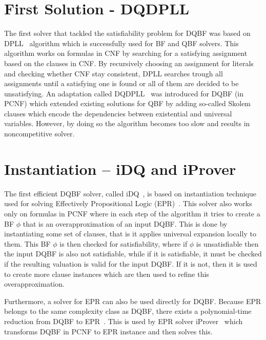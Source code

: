 \documentclass[
  digital, %
  twoside, %
  table,   %
  nolof,     %
  nolot,     %
]{fithesis3}
\theoremstyle{definition}
\theoremstyle{remark}
\begin{document}
\section{First Solution - DQDPLL}
The first solver that tackled the satisfiability problem for DQBF was based on DPLL~\cite{DPLL} algorithm which is successfully used for BF and QBF solvers. This algorithm works on formulas in CNF by searching for a satisfying assignment based on the clauses in CNF. By recursively choosing an assignment for literals and checking whether CNF stay consistent, DPLL searches trough all assignments until a satisfying one is found or all of them are decided to be unsatisfying. An adaptation called DQDPLL~\cite{DPLLalgorithm} was introduced for DQBF (in PCNF) which extended existing solutions for QBF by adding so-called Skolem clauses which encode the dependencies between existential and universal variables. However, by doing so the algorithm becomes too slow and results in noncompetitive solver.

\section{Instantiation -- iDQ and iProver}
The first efficient DQBF solver, called iDQ~\cite{iDQandDQDIMACS}, is based on instantiation technique used for solving Effectively Propositional Logic (EPR)~\cite{iProver}. This solver also works only on formulas in PCNF where in each step of the algorithm it tries to create a BF $\phi$ that is an overapproximation of an input DQBF. This is done by instantiating some set of clauses, that is it applies universal expansion locally to them. This BF $\phi$ is then checked for satisfiability, where if $\phi$ is unsatisfiable then the input DQBF is also not satisfiable, while if it is satisfiable, it must be checked if the resulting valuation is valid for the input DQBF. If it is not, then it is used to create more clause instances which are then used to refine this overapproximation.

Furthermore, a solver for EPR can also be used directly for DQBF. Because EPR belongs to the same complexity class as DQBF, there exists a polynomial-time reduction from DQBF to EPR~\cite{iDQandDQDIMACS}. This is used by EPR solver iProver~\cite{iProver} which transforms DQBF in PCNF to EPR instance and then solves this. %
\end{document}
